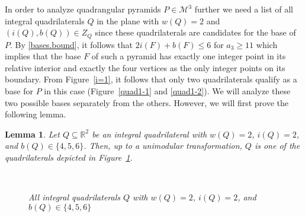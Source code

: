 \documentclass[a4paper]{article}
\theoremstyle{plain}
\newtheorem{lemma}[nn]{Lemma}
\begin{document}
In order to analyze quadrangular pyramids $P \in {\mathcal{M}^3}$ further
we need a list of all integral quadrilaterals $Q$ in the
plane with $w(Q) = 2$ and $(i(Q),b(Q)) \in Z_Q$ since these
quadrilaterals are candidates for the base of $P$.
By \eqref{bases.bound}, it follows that $2 i(F) + b(F) \leq
6$ for $a_3 \geq 11$ which implies that the base $F$ of such
a pyramid has exactly one integer point in its relative
interior and exactly the four vertices as the only integer
points on its boundary.
From Figure~\ref{i=1}, it follows that only two
quadrilaterals qualify as a base for $P$ in this case
(Figure~\ref{quad1-1} and \ref{quad1-2}).
We will analyze these two possible bases separately from the
others. However, we will first prove the following lemma.

\begin{lemma} \label{i=2,i=3}
Let $Q \subseteq {\mathbb{R}}^2$ be an integral quadrilateral with
$w(Q) = 2$, $i(Q) = 2$, and $b(Q) \in \{4,5,6\}$.
Then, up to a unimodular transformation, $Q$ is one of the
quadrilaterals depicted in Figure~\ref{i=2}.
\begin{figure}[ht]
  \centering
  \qquad
  \qquad
  \qquad
  \qquad
   \\
  \qquad
  \qquad
  \qquad
  \qquad
  \caption{All integral quadrilaterals $Q$ with $w(Q) = 2$,
    $i(Q) = 2$, and $b(Q) \in \{4,5,6\}$}
  \label{i=2}
\end{figure}

\end{lemma}
\end{document}
